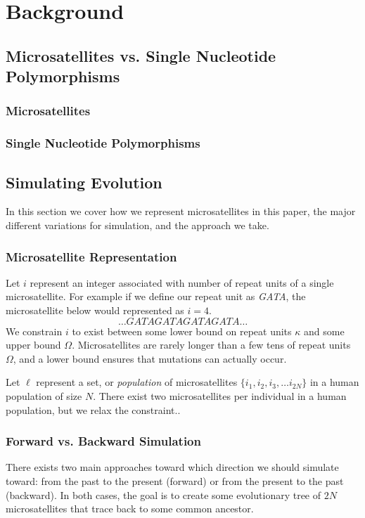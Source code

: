 \section{Background}\label{sec:b}
\subsection{Microsatellites vs. Single Nucleotide Polymorphisms}\label{subsec:mvsnp}
\subsubsection{Microsatellites}
\subsubsection{Single Nucleotide Polymorphisms}

\subsection{Simulating Evolution}\label{subsec:se}
In this section we cover how we represent microsatellites in this paper, the major different variations for simulation,
and the approach we take.

\subsubsection{Microsatellite Representation}
Let $i$ represent an integer associated with number of repeat units of a single microsatellite.
For example if we define our repeat unit as \emph{GATA}, the microsatellite below would represented as $i=4$.
\begin{equation*}
    \ldots GATAGATAGATAGATA \ldots
\end{equation*}
We constrain $i$ to exist between some lower bound on repeat units $\kappa$ and some upper bound $\Omega$.
Microsatellites are rarely longer than a few tens of repeat units $\Omega$, and a lower bound ensures that mutations can
actually occur.

Let $\ell$ represent a set, or \emph{population} of microsatellites $\{ i_1, i_2, i_3, \ldots i_{2N} \}$ in a
human population of size $N$.
There exist two microsatellites per individual in a human population, but we relax the constraint..

\subsubsection{Forward vs. Backward Simulation}
There exists two main approaches toward which direction we should simulate toward: from the past to the present
(forward) or from the present to the past (backward).
In both cases, the goal is to create some evolutionary tree of $2N$ microsatellites that trace back to some common
ancestor.

